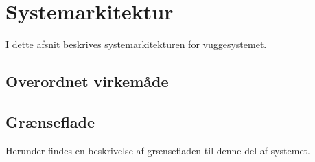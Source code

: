 \section{Systemarkitektur}

I dette afsnit beskrives systemarkitekturen for vuggesystemet.

\subsection*{Overordnet virkemåde}

\subsection*{Grænseflade}
Herunder findes en beskrivelse af grænsefladen til denne del af systemet.

